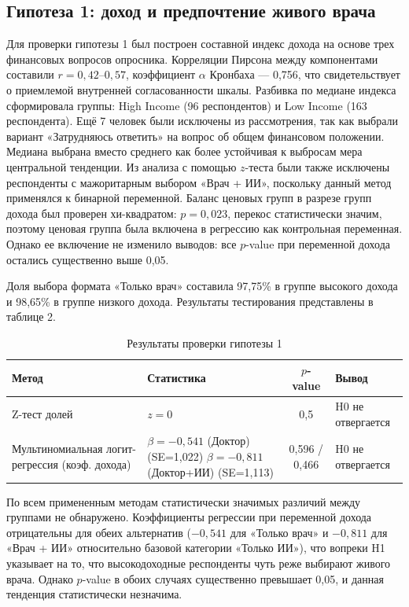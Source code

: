 \documentclass[12pt, a4paper]{article}
\begin{document}
\subsection{Гипотеза 1: доход и предпочтение живого врача}
Для проверки гипотезы 1 был построен составной индекс дохода на основе трех финансовых вопросов опросника. Корреляции Пирсона между компонентами составили $r = 0,42$--$0,57$, коэффициент $\alpha$ Кронбаха --- 0,756, что свидетельствует о приемлемой внутренней согласованности шкалы. Разбивка по медиане индекса сформировала группы: High Income (96 респондентов) и Low Income (163 респондента). Ещё 7 человек были исключены из рассмотрения, так как выбрали вариант «Затрудняюсь ответить» на вопрос об общем финансовом положении. Медиана выбрана вместо среднего как более устойчивая к выбросам мера центральной тенденции. Из анализа с помощью $z$-теста были также исключены респонденты с мажоритарным выбором «Врач + ИИ», поскольку данный метод применялся к бинарной переменной. Баланс ценовых групп в разрезе групп дохода был проверен хи-квадратом: $p = 0,023$, перекос статистически значим, поэтому ценовая группа была включена в регрессию как контрольная переменная. Однако ее включение не изменило выводов: все $p$-value при переменной дохода остались существенно выше 0,05.

Доля выбора формата «Только врач» составила 97,75\% в группе высокого дохода и 98,65\% в группе низкого дохода. Результаты тестирования представлены в таблице 2.

\begin{table}[h]
\centering
\caption{Результаты проверки гипотезы 1}
\label{tab:hyp1}
\small
\begin{tabularx}{\textwidth}{p{3.5cm} X c p{2.2cm}}
\toprule
\textbf{Метод} & \textbf{Статистика} & \textbf{$p$-value} & \textbf{Вывод} \\
\midrule
Z-тест долей & $z = 0$ & 0,5 & H0 не отвергается \\
Мультиномиальная логит-регрессия \newline (коэф. дохода) & $\beta = -0,541$ (Доктор) (SE=1,022) \newline $\beta = -0,811$ (Доктор+ИИ) (SE=1,113) & 0,596 / 0,466 & H0 не отвергается \\
\bottomrule
\end{tabularx}
\end{table}

По всем примененным методам статистически значимых различий между группами не обнаружено. Коэффициенты регрессии при переменной дохода отрицательны для обеих альтернатив ($-0,541$ для «Только врач» и $-0,811$ для «Врач + ИИ» относительно базовой категории «Только ИИ»), что вопреки H1 указывает на то, что высокодоходные респонденты чуть реже выбирают живого врача. Однако $p$-value в обоих случаях существенно превышает 0,05, и данная тенденция статистически незначима.
\end{document}
